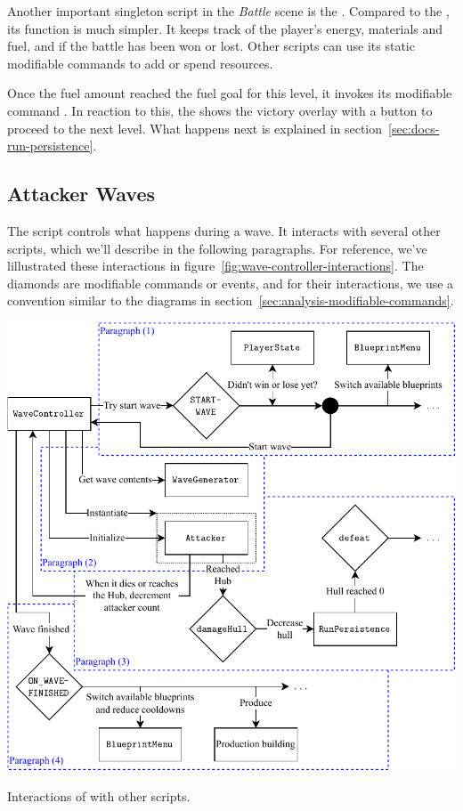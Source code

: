 Another important singleton script in the \emph{Battle} scene is the .
Compared to the , its function is much simpler.
It keeps track of the player's energy, materials and fuel, and if the battle has been won or lost.
Other scripts can use its static modifiable commands to add or spend resources.

Once the fuel amount reached the fuel goal for this level, it invokes its modifiable command .
In reaction to this, the  shows the victory overlay with a button to proceed to the next level.
What happens next is explained in section~\ref{sec:docs-run-persistence}.

\subsection{Attacker Waves}\label{sec:docs-waves}

The  script controls what happens during a wave.
It interacts with several other scripts, which we'll describe in the following paragraphs.
For reference, we've lillustrated these interactions in figure~\ref{fig:wave-controller-interactions}.
The diamonds are modifiable commands or events, and for their interactions, we use a convention similar to the diagrams in section~\ref{sec:analysis-modifiable-commands}.

\begin{center}
    \captionsetup{type=figure}
    \includegraphics[width=\textwidth]{img/wave controller connections.pdf}
    \caption{Interactions of  with other scripts.}
    \label{fig:wave-controller-interactions}
\end{center}

